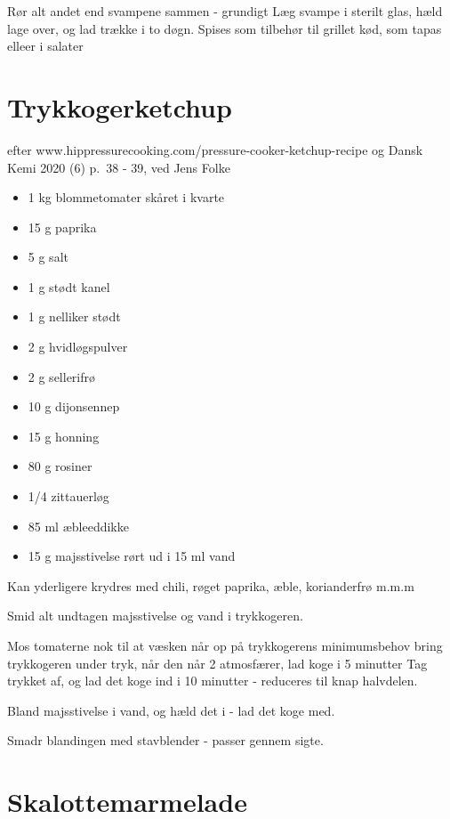\documentclass[
]{book}
\providecommand{\tightlist}{%
  \setlength{\itemsep}{0pt}\setlength{\parskip}{0pt}}
\begin{document}
Rør alt andet end svampene sammen - grundigt
Læg svampe i sterilt glas, hæld lage over, og lad trække i
to døgn. Spises som tilbehør til grillet kød, som tapas elleer
i salater

\hypertarget{trykkogerketchup}{%
\section{Trykkogerketchup}\label{trykkogerketchup}}

efter www.hippressurecooking.com/pressure-cooker-ketchup-recipe
og Dansk Kemi 2020 (6) p.~38 - 39, ved Jens Folke

\begin{itemize}
\tightlist
\item
  1 kg blommetomater skåret i kvarte
\item
  15 g paprika
\item
  5 g salt
\item
  1 g stødt kanel
\item
  1 g nelliker stødt
\item
  2 g hvidløgspulver
\item
  2 g sellerifrø
\item
  10 g dijonsennep
\item
  15 g honning
\item
  80 g rosiner
\item
  1/4 zittauerløg
\item
  85 ml æbleeddikke
\item
  15 g majsstivelse rørt ud i 15 ml vand
\end{itemize}

Kan yderligere krydres med chili, røget paprika, æble, korianderfrø
m.m.m

Smid alt undtagen majsstivelse og vand i trykkogeren.

Mos tomaterne nok til at væsken når op på trykkogerens minimumsbehov
bring trykkogeren under tryk, når den når 2 atmosfærer, lad koge i
5 minutter
Tag trykket af, og lad det koge ind i 10 minutter - reduceres til knap
halvdelen.

Bland majsstivelse i vand, og hæld det i - lad det koge med.

Smadr blandingen med stavblender - passer gennem sigte.

\hypertarget{skalottemarmelade}{%
\section{Skalottemarmelade}\label{skalottemarmelade}}
\end{document}
